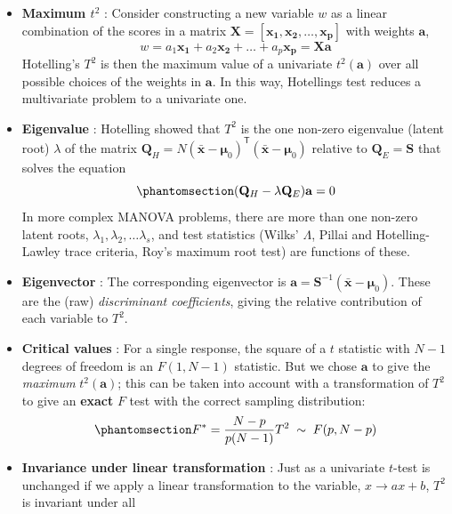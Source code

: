 \documentclass[
  letterpaper,
  10pt,
  krantz2]{krantz}
\begin{document}
{\begin{itemize}
\item
  \textbf{Maximum \(t^2\)} : Consider constructing a new variable \(w\)
  as a linear combination of the scores in a matrix
  \(\mathbf{X} = [ \mathbf{x_1}, \mathbf{x_2}, \dots, \mathbf{x_p}]\)
  with weights \(\mathbf{a}\), \[
  w = a_1 \mathbf{x_1} + a_2 \mathbf{x_2} + \dots + a_p \mathbf{x_p} = \mathbf{X} \mathbf{a}
  \] Hotelling's \(T^2\) is then the maximum value of a univariate
  \(t^2 (\mathbf{a})\) over all possible choices of the weights in
  \(\mathbf{a}\). In this way, Hotellings test reduces a multivariate
  problem to a univariate one.
\item
  \textbf{Eigenvalue} : Hotelling showed that \(T^2\) is the one
  non-zero eigenvalue (latent root) \(\lambda\) of the matrix
  \(\mathbf{Q}_H = N (\bar{\mathbf{x}} - \mathbf{\mu}_0)^\textsf{T}  (\bar{\mathbf{x}} - \mathbf{\mu}_0)\)
  relative to \(\mathbf{Q}_E = \mathbf{S}\) that solves the equation
  \begin{equation}\phantomsection\label{eq-eigen}{
  (\mathbf{Q}_H - \lambda \mathbf{Q}_E) \mathbf{a} = 0
  }\end{equation} In more complex MANOVA problems, there are more than
  one non-zero latent roots, \(\lambda_1, \lambda_2, \dots \lambda_s\),
  and test statistics (Wilks' \(\Lambda\), Pillai and Hotelling-Lawley
  trace criteria, Roy's maximum root test) are functions of these.
\item
  \textbf{Eigenvector} : The corresponding eigenvector is
  \(\mathbf{a} = \mathbf{S}^{-1} (\bar{\mathbf{x}} - \mathbf{\mu}_0)\).
  These are the (raw) \emph{discriminant coefficients}, giving the
  relative contribution of each variable to \(T^2\).
\item
  \textbf{Critical values} : For a single response, the square of a
  \(t\) statistic with \(N-1\) degrees of freedom is an \(F (1, N-1)\)
  statistic. But we chose \(\mathbf{a}\) to give the \emph{maximum}
  \(t^2 (\mathbf{a})\); this can be taken into account with a
  transformation of \(T^2\) to give an \textbf{exact} \(F\) test with
  the correct sampling distribution:
  \begin{equation}\phantomsection\label{eq-Fstat}{
  F^* = \frac{N - p}{p (N-1)} T^2 \; \sim \; F (p, N - p)
  }\end{equation}
\item
  \textbf{Invariance under linear transformation} : Just as a univariate
  \(t\)-test is unchanged if we apply a linear transformation to the
  variable, \(x \rightarrow a x + b\), \(T^2\) is invariant under all

\end{itemize}}
\end{document}
